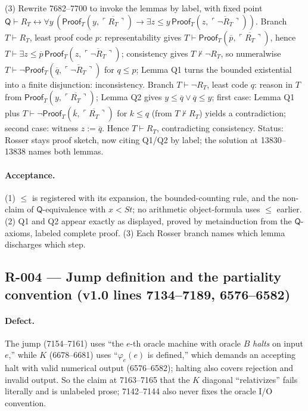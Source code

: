 (3) Rewrite 7682--7700 to invoke the lemmas by label, with fixed point \(\mathsf Q\vdash R_T\leftrightarrow\forall y\,(\mathsf{Proof}_T(y,\overline{\ulcorner R_T\urcorner})\to\exists z\!\leq\! y\,\mathsf{Proof}_T(z,\overline{\ulcorner\neg R_T\urcorner}))\).  Branch \(T\vdash R_T\), least proof code \(p\): representability gives \(T\vdash\mathsf{Proof}_T(\overline p,\overline{\ulcorner R_T\urcorner})\), hence \(T\vdash\exists z\!\leq\!\overline p\,\mathsf{Proof}_T(z,\overline{\ulcorner\neg R_T\urcorner})\); consistency gives \(T\nvdash\neg R_T\), so numeralwise \(T\vdash\neg\mathsf{Proof}_T(\overline q,\overline{\ulcorner\neg R_T\urcorner})\) for \(q\leq p\); Lemma Q1 turns the bounded existential into a finite disjunction: inconsistency.  Branch \(T\vdash\neg R_T\), least code \(q\): reason in \(T\) from \(\mathsf{Proof}_T(y,\overline{\ulcorner R_T\urcorner})\); Lemma Q2 gives \(y\leq\overline q\lor\overline q\leq y\); first case: Lemma Q1 plus \(T\vdash\neg\mathsf{Proof}_T(\overline k,\overline{\ulcorner R_T\urcorner})\) for \(k\leq q\) (from \(T\nvdash R_T\)) yields a contradiction; second case: witness \(z:=\overline q\).  Hence \(T\vdash R_T\), contradicting consistency.  Status: Rosser stays proof sketch, now citing Q1/Q2 by label; the solution at 13830--13838 names both lemmas.

\paragraph{Acceptance.} (1) \(\leq\) is registered with its expansion, the bounded-counting rule, and the non-claim of \(\mathsf Q\)-equivalence with \(x<St\); no arithmetic object-formula uses \(\leq\) earlier.  (2) Q1 and Q2 appear exactly as displayed, proved by metainduction from the \(\mathsf Q\)-axioms, labeled complete proof.  (3) Each Rosser branch names which lemma discharges which step.

\subsection*{R-004 --- Jump definition and the partiality convention (v1.0 lines 7134--7189, 6576--6582)}

\paragraph{Defect.} The jump (7154--7161) uses ``the \(e\)-th oracle machine with oracle \(B\) \emph{halts} on input \(e\),'' while \(K\) (6678--6681) uses ``\(\varphi_e(e)\) is defined,'' which demands an accepting halt with valid numerical output (6576--6582); halting also covers rejection and invalid output.  So the claim at 7163--7165 that the \(K\) diagonal ``relativizes'' fails literally and is unlabeled prose; 7142--7144 also never fixes the oracle I/O convention.

